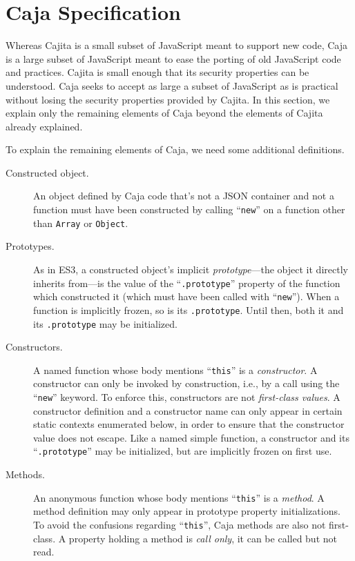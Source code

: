 \documentclass[letterpaper,twocolumn,10pt]{article}
\newcommand{\code}[1]{{\tt {#1}}}              %
\begin{document}
\section{Caja Specification}
\label{sec:caja-spec}

Whereas Cajita is a small subset of JavaScript meant to support new code, 
Caja is a large subset of JavaScript meant to ease the porting of old 
JavaScript code and practices. Cajita is small enough that its security 
properties can be understood. Caja seeks to accept as large a subset of 
JavaScript as is practical without losing the security properties provided by 
Cajita. In this section, we explain only the remaining elements of Caja 
beyond the elements of Cajita already explained.

To explain the remaining elements of Caja, we need some additional 
definitions.

\begin{description}

  \item[Constructed object.] An object defined by Caja code that's not a JSON 
  container and not a function must have been constructed by calling 
  ``\code{new}'' on a function other than \code{Array} or \code{Object}.

  \item[Prototypes.] As in ES3, a constructed object's implicit 
  \emph{prototype}---the object it directly inherits from---is the value of 
  the ``\code{.prototype}'' property of the function which constructed it 
  (which must have been called with ``\code{new}''). When a function is 
  implicitly frozen, so is its \code{.prototype}. Until then, both it and its 
  \code{.prototype} may be initialized. 

  \item[Constructors.] A named function whose body mentions ``\code{this}'' 
  is a \emph{constructor}. A constructor can only be invoked by construction, 
  i.e., by a call using the ``\code{new}'' keyword. To enforce this, 
  constructors are not \emph{first-class values}. A constructor definition 
  and a constructor name can only appear in certain static contexts 
  enumerated below, in order to ensure that the constructor value does not 
  escape. Like a named simple function, a constructor and its 
  ``\code{.prototype}'' may be initialized, but are implicitly frozen on 
  first use.
    
  \item[Methods.] An anonymous function whose body mentions ``\code{this}'' 
  is a \emph{method}. A method definition may only appear in prototype 
  property initializations. To avoid the confusions regarding 
  ``\code{this}'', Caja methods are also not first-class. A property holding 
  a method is \emph{call only}, it can be called but not read.
  
\end{description}
\end{document}
